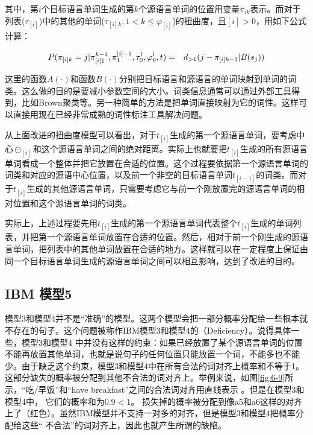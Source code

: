 \noindent 其中，第$i$个目标语言单词生成的第$k$个源语言单词的位置用变量$\pi_{ik}$表示。而对于列表($\tau_{[i]}$)中的其他的单词($\tau_{[i]k},1 < k \le \varphi_{[i]}$)的扭曲度，且$[i]>0$，用如下公式计算：

\begin{eqnarray}
{P}(\pi_{[i]k}=j|{\pi}_{[i]1}^{k-1},\pi_1^{[i]-1},\tau_0^l,\varphi_0^l,{t}) & = & d_{>1}(j-\pi_{[i]k-1}|B(s_j))
\label{eq:6-23}
\end{eqnarray}

\parinterval 这里的函数$A(\cdot)$和函数$B(\cdot)$分别把目标语言和源语言的单词映射到单词的词类。这么做的目的是要减小参数空间的大小。词类信息通常可以通过外部工具得到，比如Brown聚类等。另一种简单的方法是把单词直接映射为它的词性。这样可以直接用现在已经非常成熟的词性标注工具解决问题。

\parinterval 从上面改进的扭曲度模型可以看出，对于$t_{[i]}$生成的第一个源语言单词，要考虑中心$\odot_{[i]}$和这个源语言单词之间的绝对距离。实际上也就要把$t_{[i]}$生成的所有源语言单词看成一个整体并把它放置在合适的位置。这个过程要依据第一个源语言单词的词类和对应的源语中心位置，以及前一个非空的目标语言单词$t_{[i-1]}$的词类。而对于$t_{[i]}$生成的其他源语言单词，只需要考虑它与前一个刚放置完的源语言单词的相对位置和这个源语言单词的词类。

\parinterval 实际上，上述过程要先用$t_{[i]}$生成的第一个源语言单词代表整个$t_{[i]}$生成的单词列表，并把第一个源语言单词放置在合适的位置。然后，相对于前一个刚生成的源语言单词，把列表中的其他单词放置在合适的地方。这样就可以在一定程度上保证由同一个目标语言单词生成的源语言单词之间可以相互影响，达到了改进的目的。


\subsection{ IBM 模型5}

\parinterval 模型3和模型4并不是“准确”的模型。这两个模型会把一部分概率分配给一些根本就不存在的句子。这个问题被称作IBM模型3和模型4的{\small{}}（Deficiency）。说得具体一些，模型3和模型4 中并没有这样的约束：如果已经放置了某个源语言单词的位置不能再放置其他单词，也就是说句子的任何位置只能放置一个词，不能多也不能少。由于缺乏这个约束，模型3和模型4中在所有合法的词对齐上概率和不等于1。 这部分缺失的概率被分配到其他不合法的词对齐上。举例来说，如图\ref{fig:6-9}所示，“吃/早饭”和“have breakfast”之间的合法词对齐用直线表示 。但是在模型3和模型4中， 它们的概率和为$0.9<1$。 损失掉的概率被分配到像a5和a6这样的对齐上了（红色）。虽然IBM模型并不支持一对多的对齐，但是模型3和模型4把概率分配给这些“ 不合法”的词对齐上，因此也就产生所谓的缺陷。

